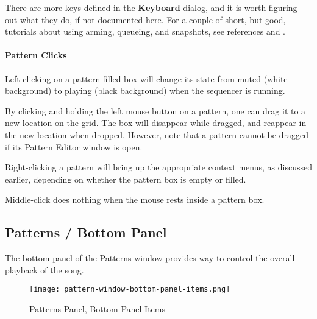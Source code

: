    There are more keys defined in the \textbf{Keyboard} dialog, and it is
   worth figuring out what they do, if not documented here.
   For a couple of short, but good, tutorials about using arming, queueing,
   and snapshots, see references \cite{wootangent1}
   and \cite{wootangent2}.

\paragraph{Pattern Clicks}
\label{paragraph:seq64_patterns_pattern_Clicks}

   Left-clicking on a pattern-filled box will change its state
   from muted (white background) to playing (black background) when
   the sequencer is running.

%

   By clicking and holding the left mouse button on a pattern,
   one can drag it to a new location on the grid.  The box
   will disappear while dragged, and reappear in the new location when
   dropped.  However, note that a pattern cannot be dragged if its
   Pattern Editor window is open.

   Right-clicking a pattern will bring up the appropriate context menus, as
   discussed earlier, depending on whether the pattern box is empty or
   filled.

   Middle-click does nothing when the mouse rests inside a pattern box.

\subsection{Patterns / Bottom Panel}
\label{subsec:seq64_patterns_panel_bottom}

   The bottom panel of the Patterns window provides way to control the
   overall playback of the song.

\begin{figure}[H]
   \centering 
   \texttt{[image: pattern-window-bottom-panel-items.png]}
   \caption{Patterns Panel, Bottom Panel Items}
   \label{fig:pattern_window_bottom_panel_items}
\end{figure}

